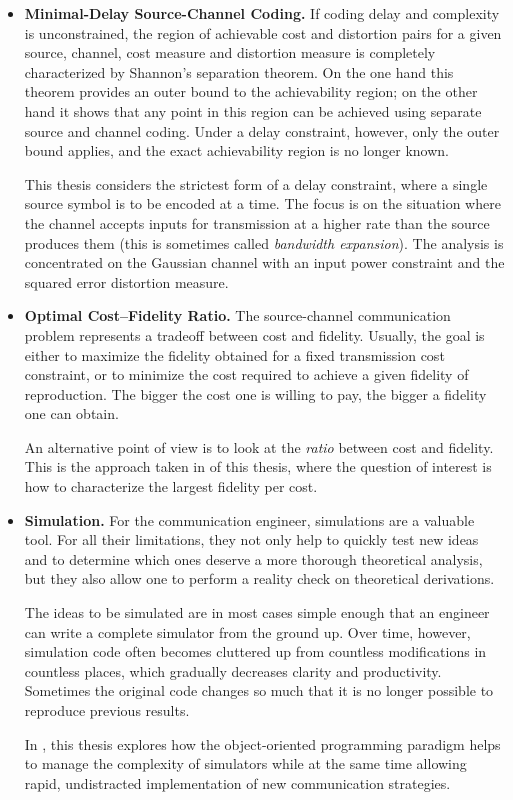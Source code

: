\begin{itemize}

  \item \textbf{Minimal-Delay Source-Channel Coding.} If coding delay and
    complexity is unconstrained, the region of achievable cost and distortion
    pairs for a given source, channel, cost measure and distortion measure is
    completely characterized by Shannon's separation theorem. On the one hand
    this theorem provides an outer bound to the achievability region; on the
    other hand it shows that any point in this region can be achieved using
    separate source and channel coding. Under a delay constraint, however, only
    the outer bound applies, and the exact achievability region is no longer
    known. 

    This thesis considers the strictest form of a delay constraint, where a
    single source symbol is to be encoded at a time. The focus is
    on the situation where the channel accepts inputs for transmission at a
    higher rate than the source produces them (this is sometimes called
    \emph{bandwidth expansion}). The analysis is concentrated on the Gaussian
    channel with an input power constraint and the squared error distortion
    measure. 

  \item \textbf{Optimal Cost--Fidelity Ratio.} The source-channel communication
    problem represents a tradeoff between cost and fidelity. Usually, the goal
    is either to maximize the fidelity obtained for a fixed transmission cost
    constraint, or to minimize the cost required to achieve a given fidelity of
    reproduction. The bigger the cost one is willing to pay, the bigger a
    fidelity one can obtain. 

    An alternative point of view is to look at the \emph{ratio} between cost and
    fidelity. This is the approach taken in  of this thesis,
    where the question of interest is how to characterize the largest fidelity
    per cost.

  \item \textbf{Simulation.} For the communication engineer, simulations are a
    valuable tool. For all their limitations, they not only help to quickly test
    new ideas and to determine which ones deserve a more thorough theoretical
    analysis, but they also allow one to perform a reality check on theoretical
    derivations.

    The ideas to be simulated are in most cases simple enough that an engineer
    can write a complete simulator from the ground up. Over time, however,
    simulation code often becomes cluttered up from countless modifications in
    countless places, which gradually decreases clarity and productivity.
    Sometimes the original code changes so much that it is no longer possible to
    reproduce previous results.

    In , this thesis explores how the object-oriented
    programming paradigm helps to manage the complexity of simulators while at
    the same time allowing rapid, undistracted implementation of new
    communication strategies. 

\end{itemize}



